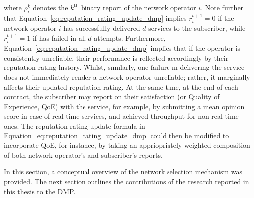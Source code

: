 {where $\rho_i^k$ denotes the $k^{\text{th}}$ binary report of the network operator $i$.}  Note further that Equation~\eqref{eq:reputation_rating_update_dmp} implies $r_i^{t+1} = 0$ if the network operator $i$ has successfully delivered $d$ services to the subscriber, while $r_i^{t+1} = 1$ if has failed in all $d$ attempts. Furthermore, Equation~\eqref{eq:reputation_rating_update_dmp} implies that if the operator is consistently unreliable, their performance is reflected accordingly by their reputation rating history. Whilst, similarly, one failure in delivering the service does not immediately render a network operator unreliable; rather, it marginally affects their updated reputation rating. At the same time, at the end of each contract, the subscriber may report on their satisfaction (or Quality of Experience, QoE) with the service, for example, by submitting a mean opinion score in case of real-time services, and achieved throughput for non-real-time ones. The reputation rating update formula in Equation~\eqref{eq:reputation_rating_update_dmp} could then be modified to incorporate QoE, for instance, by taking an appriopriately weighted composition of both network operator's and subscriber's reports. 

In this section, a conceptual overview of the network selection mechanism was provided. The next section outlines the contributions of the research reported in this thesis to the DMP.

